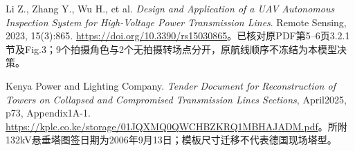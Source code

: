\noindent [R9] Li Z., Zhang Y., Wu H., et al. \emph{Design and Application of a UAV Autonomous Inspection System for High-Voltage Power Transmission Lines}. Remote Sensing, 2023, 15(3):865. \url{https://doi.org/10.3390/rs15030865}。已核对原PDF第5--6页3.2.1节及Fig.3；9个拍摄角色与2个无拍摄转场点分开，原航线顺序不冻结为本模型决策。

\noindent [R10] Kenya Power and Lighting Company. \emph{Tender Document for Reconstruction of Towers on Collapsed and Compromised Transmission Lines Sections}, April2025, p73, Appendix1A-1. \url{https://kplc.co.ke/storage/01JQXMQ0QWCHBZKRQ1MBHAJADM.pdf}。所附132kV悬垂塔图签日期为2006年9月13日；模板尺寸迁移不代表德国现场塔型。

